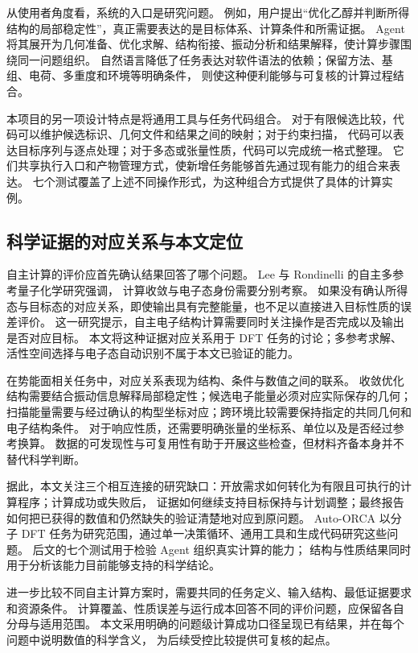 \documentclass[UTF8,fontset=fandol,a4paper,11pt]{ctexart}
\begin{document}
从使用者角度看，系统的入口是研究问题。%
例如，用户提出“优化乙醇并判断所得结构的局部稳定性”，真正需要表达的是目标体系、计算条件和所需证据。%
Agent 将其展开为几何准备、优化求解、结构衔接、振动分析和结果解释，使计算步骤围绕同一问题组织。%
自然语言降低了任务表达对软件语法的依赖；保留方法、基组、电荷、多重度和环境等明确条件，%
则使这种便利能够与可复核的计算过程结合。

本项目的另一项设计特点是将通用工具与任务代码组合。%
对于有限候选比较，代码可以维护候选标识、几何文件和结果之间的映射；对于约束扫描，%
代码可以表达目标序列与逐点处理；对于多态或张量性质，代码可以完成统一格式整理。%
它们共享执行入口和产物管理方式，使新增任务能够首先通过现有能力的组合来表达。%
七个测试覆盖了上述不同操作形式，为这种组合方式提供了具体的计算实例。

\subsection{科学证据的对应关系与本文定位}
自主计算的评价应首先确认结果回答了哪个问题。%
Lee 与 Rondinelli 的自主多参考量子化学研究强调，%
计算收敛与电子态身份需要分别考察\cite{multirefagent}。%
如果没有确认所得态与目标态的对应关系，即使输出具有完整能量，也不足以直接进入目标性质的误差评价。%
这一研究提示，自主电子结构计算需要同时关注操作是否完成以及输出是否对应目标。%
本文将这种证据对应关系用于 DFT 任务的讨论；多参考求解、%
活性空间选择与电子态自动识别不属于本文已验证的能力。

在势能面相关任务中，对应关系表现为结构、条件与数值之间的联系。%
收敛优化结构需要结合振动信息解释局部稳定性；候选电子能量必须对应实际保存的几何；%
扫描能量需要与经过确认的构型坐标对应；跨环境比较需要保持指定的共同几何和电子结构条件。%
对于响应性质，还需要明确张量的坐标系、单位以及是否经过参考换算。%
数据的可发现性与可复用性有助于开展这些检查\cite{fair}，但材料齐备本身并不替代科学判断。

据此，本文关注三个相互连接的研究缺口：开放需求如何转化为有限且可执行的计算程序；计算成功或失败后，%
证据如何继续支持目标保持与计划调整；最终报告如何把已获得的数值和仍然缺失的验证清楚地对应到原问题。%
Auto-ORCA 以分子 DFT 任务为研究范围，通过单一决策循环、通用工具和生成代码研究这些问题。%
后文的七个测试用于检验 Agent 组织真实计算的能力；%
结构与性质结果同时用于分析该能力目前能够支持的科学结论。

进一步比较不同自主计算方案时，需要共同的任务定义、输入结构、最低证据要求和资源条件。%
计算覆盖、性质误差与运行成本回答不同的评价问题，应保留各自分母与适用范围。%
本文采用明确的问题级计算成功口径呈现已有结果，并在每个问题中说明数值的科学含义，%
为后续受控比较提供可复核的起点。
\end{document}
